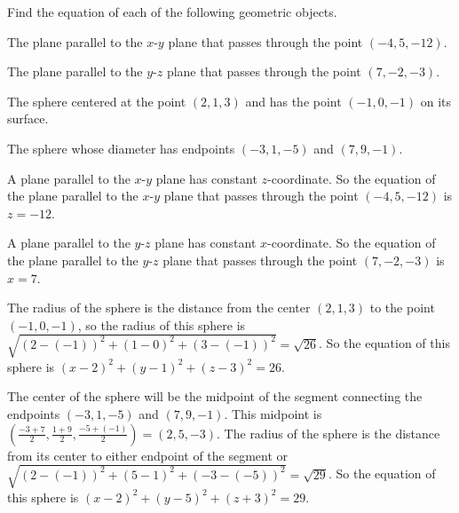 \begin{exercises} 

\item \label{Ez:9.1.1}   Find the equation of each of the following geometric objects.


  \ba
  	\item  The plane parallel to the $x$-$y$ plane that passes through the point $(-4,5,-12)$.
	\item  The plane parallel to the $y$-$z$ plane that passes through the point $(7, -2, -3)$.
	\item   The sphere centered at the point $(2,1,3)$ and has the point $(-1,0,-1)$ on its surface.
	\item  The sphere whose diameter has endpoints $(-3,1,-5)$ and $(7,9,-1)$.
  
  \ea 

\begin{exerciseSolution}
  \ba
  	\item  A plane parallel to the $x$-$y$ plane has constant $z$-coordinate. So the equation of the plane parallel to the $x$-$y$ plane that passes through the point $(-4,5,-12)$ is $z=-12$. 
	\item   A plane parallel to the $y$-$z$ plane has constant $x$-coordinate. So the equation of the plane parallel to the $y$-$z$ plane that passes through the point $(7, -2, -3)$ is $x=7$.
	\item   The radius of the sphere is the distance from the center $(2,1,3)$ to the point $(-1,0,-1)$, so the radius of this sphere is $\sqrt{(2-(-1))^2 + (1-0)^2 + (3-(-1))^2} = \sqrt{26}$. So the equation of this sphere is $(x-2)^2 + (y-1)^2 + (z-3)^2 = 26$. 
	\item  The center of the sphere will be the midpoint of the segment connecting the endpoints $(-3,1,-5)$ and $(7,9,-1)$. This midpoint is $\left(\frac{-3+7}{2}, \frac{1+9}{2}, \frac{-5+(-1)}{2} \right) = (2, 5, -3)$. The radius of the sphere is the distance from its center to either endpoint of the segment or $\sqrt{(2-(-1))^2 + (5-1)^2 + (-3-(-5))^2} = \sqrt{29}$. So the equation of this sphere is $(x-2)^2 + (y-5)^2 + (z+3)^2 = 29$.
  

\end{exerciseSolution}
\end{exercises}
